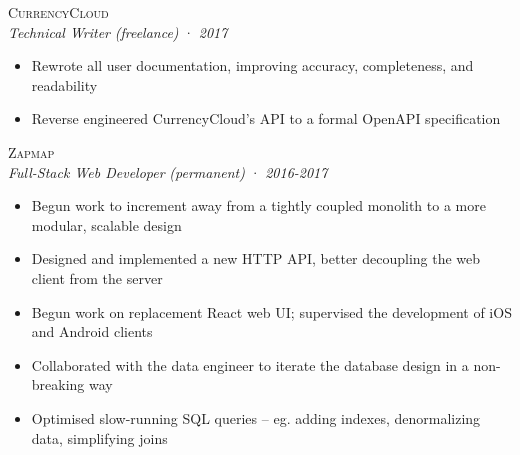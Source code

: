 \documentclass[a4paper,10pt]{article}
\newcommand{\resumeSubheading}[5][12pt]{
  \vspace{#1}
  {\scshape{#2}} \\
  \textit{\small{#3}} \textit{\small{(#4)}} · \textit{\small{#5}}
  \vspace{2pt}
}
\newcommand{\resumeListStart}{\begin{itemize}}
\newcommand{\resumeListEnd}{\end{itemize}}
\newcommand{\resumeItem}[1]{
  \item[\-·]\small{{#1\vspace{1pt}}}
}
\begin{document}
  \begin{minipage}{\textwidth}
    \resumeSubheading
      {CurrencyCloud}
      {Technical Writer}
      {freelance}
      {2017}
    \resumeListStart
      \resumeItem{Rewrote all user documentation, improving accuracy, completeness, and readability}
      \resumeItem{Reverse engineered CurrencyCloud's API to a formal OpenAPI specification}
    \resumeListEnd
  \end{minipage}

  \begin{minipage}{\textwidth}
    \resumeSubheading
      {Zapmap}
      {Full-Stack Web Developer}
      {permanent}
      {2016-2017}
    \resumeListStart
      \resumeItem{Begun work to increment away from a tightly coupled monolith to a more modular, scalable design}
      \resumeItem{Designed and implemented a new HTTP API, better decoupling the web client from the server}
      \resumeItem{Begun work on replacement React web UI; supervised the development of iOS and Android clients}
      \resumeItem{Collaborated with the data engineer to iterate the database design in a non-breaking way}
      \resumeItem{Optimised slow-running SQL queries – eg. adding indexes, denormalizing data, simplifying joins}
    \resumeListEnd
  \end{minipage}

\end{document}
